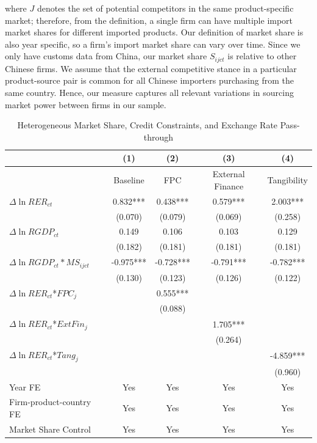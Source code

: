 \documentclass[12pt]{article}
\begin{document}
where $J$ denotes the set of potential competitors in the same product-specific market; therefore, from the definition, a single firm can have multiple import market shares for different imported products. Our definition of market share is also year specific, so a firm’s import market share can vary over time. Since we only have customs data from China, our market share $S_{ijct}$ is relative to other Chinese firms. We assume that the external competitive stance in a particular product-source pair is common for all Chinese importers purchasing from the same country. Hence, our measure captures all relevant variations in sourcing market power between firms in our sample.

\begin{table}[htb]
	\centering
	\caption{Heterogeneous Market Share, Credit Constraints, and Exchange Rate Pass-through}
	\begin{threeparttable}
		\begin{tabular}{lcccc}
			\toprule
			& (1)   & (2)   & (3)   & (4) \\
			\midrule
			&  Baseline     & FPC & External Finance& Tangibility        \\
			\midrule
			$\Delta \ln RER_{ct}$ & 0.832*** & 0.438*** & 0.579*** & 2.003*** \\
			& (0.070) & (0.079) & (0.069) & (0.258) \\
			$\Delta \ln RGDP_{ct}$ & 0.149 & 0.106 & 0.103 & 0.129 \\
			& (0.182) & (0.181) & (0.181) & (0.181) \\
			$\Delta \ln RGDP_{ct}*MS_{ijct}$ & -0.975*** & -0.728*** & -0.791*** & -0.782*** \\
			& (0.130) & (0.123) & (0.126) & (0.122) \\
			$\Delta \ln RER_{ct}$*$FPC_{j}$ &  & 0.555*** &       &  \\
			&  & (0.088) &       &  \\
			$\Delta \ln RER_{ct}$*$ExtFin_{j}$ &   &       & 1.705*** &  \\
			&  &       & (0.264) &  \\
			$\Delta \ln RER_{ct}$*$Tang_{j}$ &   &       &       & -4.859*** \\
			&   &       &       & (0.960) \\
			Year FE  & Yes  & Yes   & Yes   & Yes \\
			Firm-product-country FE & Yes    & Yes   & Yes   & Yes \\
			Market Share Control & Yes   & Yes   & Yes   & Yes \\

\end{tabular}
\end{threeparttable}
\end{table}
\end{document}
